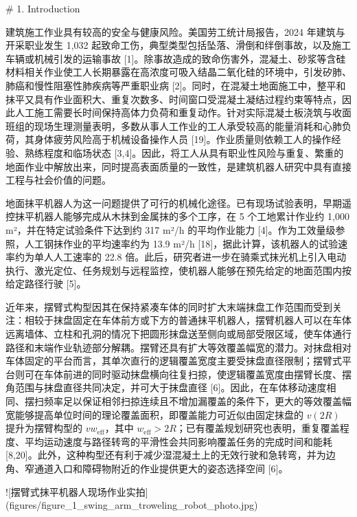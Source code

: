 # 1. Introduction

  

建筑施工作业具有较高的安全与健康风险。美国劳工统计局报告，2024 年建筑与开采职业发生 1,032 起致命工伤，典型类型包括坠落、滑倒和绊倒事故，以及施工车辆或机械引发的运输事故 [1]。除事故造成的致命伤害外，混凝土、砂浆等含硅材料相关作业使工人长期暴露在高浓度可吸入结晶二氧化硅的环境中，引发矽肺、肺癌和慢性阻塞性肺疾病等严重职业病 [2]。同时，在混凝土地面施工中，整平和抹平又具有作业面积大、重复次数多、时间窗口受混凝土凝结过程约束等特点，因此人工施工需要长时间保持高体力负荷和重复动作。针对实际混凝土板浇筑与收面班组的现场生理测量表明，多数从事人工作业的工人承受较高的能量消耗和心肺负荷，其身体疲劳风险高于机械设备操作人员 [19]。作业质量则依赖工人的操作经验、熟练程度和临场状态 [3,4]。因此，将工人从具有职业性风险与重复、繁重的地面作业中解放出来，同时提高表面质量的一致性，是建筑机器人研究中具有直接工程与社会价值的问题。

  

地面抹平机器人为这一问题提供了可行的机械化途径。已有现场试验表明，早期遥控抹平机器人能够完成从木抹到金属抹的多个工序，在 5 个工地累计作业约 1,000 m²，并在特定试验条件下达到约 317 m²/h 的平均作业能力 [4]。作为工效量级参照，人工钢抹作业的平均速率约为 13.9 m²/h [18]，据此计算，该机器人的试验速率约为单人人工速率的 22.8 倍。此后，研究者进一步在骑乘式抹光机上引入电动执行、激光定位、任务规划与远程监控，使机器人能够在预先给定的地面范围内按给定路径行驶 [5]。



近年来，摆臂式构型因其在保持紧凑车体的同时扩大末端抹盘工作范围而受到关注：相较于抹盘固定在车体前方或下方的普通抹平机器人，摆臂机器人可以在车体远离墙体、立柱和孔洞的情况下把圆形抹盘送至侧向或局部受限区域，使车体通行路径和末端作业轨迹部分解耦。摆臂还具有扩大等效覆盖幅宽的潜力。对抹盘相对车体固定的平台而言，其单次直行的逻辑覆盖宽度主要受抹盘直径限制；摆臂式平台则可在车体前进的同时驱动抹盘横向往复扫掠，使逻辑覆盖宽度由摆臂长度、摆角范围与抹盘直径共同决定，并可大于抹盘直径 [6]。因此，在车体移动速度相同、摆扫频率足以保证相邻扫掠连续且不增加漏覆盖的条件下，更大的等效覆盖幅宽能够提高单位时间的理论覆盖面积，即覆盖能力可近似由固定抹盘的 $v(2R)$ 提升为摆臂构型的 $v w_{\mathrm{eff}}$，其中 $w_{\mathrm{eff}}>2R$；已有覆盖规划研究也表明，重复覆盖程度、平均运动速度与路径转弯的平滑性会共同影响覆盖任务的完成时间和能耗 [8,20]。此外，这种构型还有利于减少湿混凝土上的无效行驶和急转弯，并为边角、窄通道入口和障碍物附近的作业提供更大的姿态选择空间 [6]。

  

![摆臂式抹平机器人现场作业实拍](figures/figure_1_swing_arm_troweling_robot_photo.jpg)

